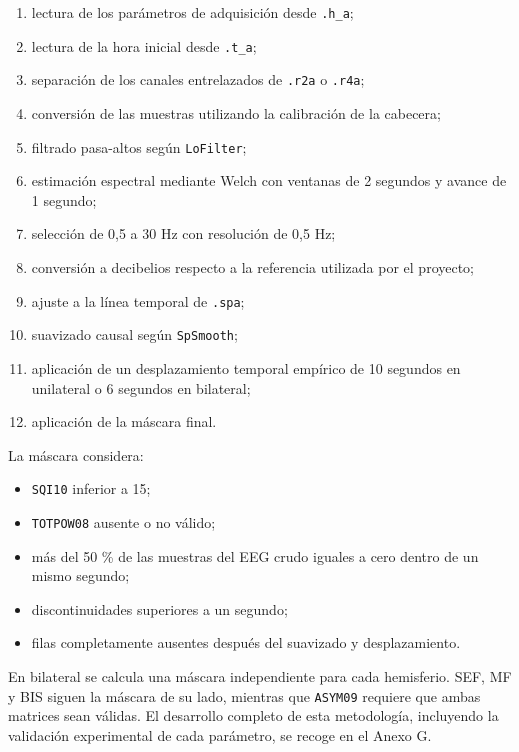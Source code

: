 \documentclass[
  spanish,
  a4paper,
  12pt,
  twoside]{memoir}
\providecommand{\tightlist}{%
  \setlength{\itemsep}{0pt}\setlength{\parskip}{0pt}}
\begin{document}
\begin{enumerate}
\def\labelenumi{\arabic{enumi}.}
\tightlist
\item
  lectura de los parámetros de adquisición desde \texttt{.h\_a};
\item
  lectura de la hora inicial desde \texttt{.t\_a};
\item
  separación de los canales entrelazados de \texttt{.r2a} o
  \texttt{.r4a};
\item
  conversión de las muestras utilizando la calibración de la cabecera;
\item
  filtrado pasa-altos según \texttt{LoFilter};
\item
  estimación espectral mediante Welch con ventanas de 2 segundos y
  avance de 1 segundo;
\item
  selección de 0,5 a 30 Hz con resolución de 0,5 Hz;
\item
  conversión a decibelios respecto a la referencia utilizada por el
  proyecto;
\item
  ajuste a la línea temporal de \texttt{.spa};
\item
  suavizado causal según \texttt{SpSmooth};
\item
  aplicación de un desplazamiento temporal empírico de 10 segundos en
  unilateral o 6 segundos en bilateral;
\item
  aplicación de la máscara final.
\end{enumerate}

La máscara considera:

\begin{itemize}
\tightlist
\item
  \texttt{SQI10} inferior a 15;
\item
  \texttt{TOTPOW08} ausente o no válido;
\item
  más del 50 \% de las muestras del EEG crudo iguales a cero dentro de
  un mismo segundo;
\item
  discontinuidades superiores a un segundo;
\item
  filas completamente ausentes después del suavizado y desplazamiento.
\end{itemize}

En bilateral se calcula una máscara independiente para cada hemisferio.
SEF, MF y BIS siguen la máscara de su lado, mientras que \texttt{ASYM09}
requiere que ambas matrices sean válidas. El desarrollo completo de esta
metodología, incluyendo la validación experimental de cada parámetro, se
recoge en el Anexo G.
\end{document}
